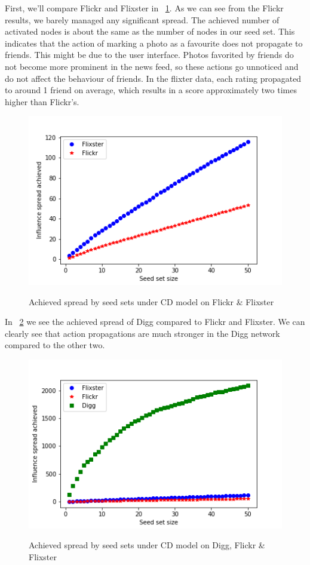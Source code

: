 \documentclass{acm_proc_article-sp}
\begin{document}
First, we'll compare Flickr and Flixster in  ~\ref{spread2}. As we can see from the Flickr results, we barely managed any significant spread. The achieved number of activated nodes is about the same as the number of nodes in our seed set. This indicates that the action of marking a photo as a favourite does not propagate to friends. This might be due to the user interface. Photos favorited by friends do not become more prominent in the news feed, so these actions go unnoticed and do not affect the behaviour of friends. In the flixter data, each rating propagated to around 1 friend on average, which results in a score approximately two times higher than Flickr's.

\begin{figure}[h]
	\includegraphics[width=\linewidth]{spread2.png}
	\centering
	\label{spread2}
	\caption{Achieved spread by seed sets under CD model on Flickr \& Flixster}
\end{figure}

In ~\ref{spread3} we see the achieved spread of Digg compared to Flickr and Flixster. We can clearly see that action propagations are much stronger in the Digg network compared to the other two.

\begin{figure}[h]
	\includegraphics[width=\linewidth]{spread3.png}
	\centering
	\label{spread3}
    \caption{Achieved spread by seed sets under CD model on Digg, Flickr \& Flixster}
\end{figure}
\end{document}
